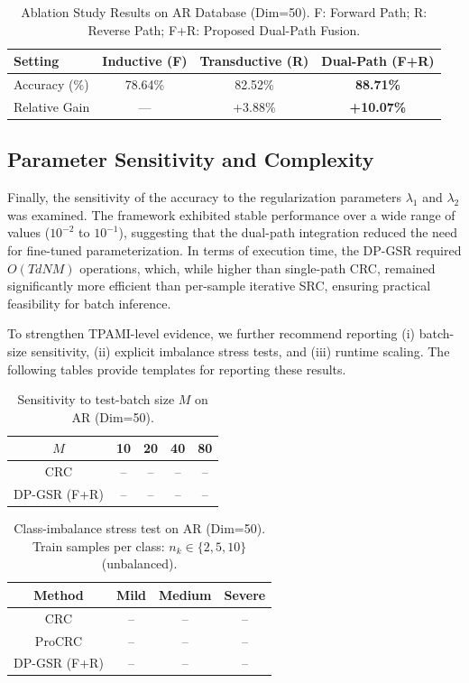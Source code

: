 \documentclass[10pt,comsoc]{IEEEtran}
\begin{document}
\begin{table}[h]
\centering
\caption{Ablation Study Results on AR Database (Dim=50). F: Forward Path; R: Reverse Path; F+R: Proposed Dual-Path Fusion.}
\label{tab:ablation}
\begin{tabular}{lccc}
\hline
\textbf{Setting} & \textbf{Inductive (F)} & \textbf{Transductive (R)} & \textbf{Dual-Path (F+R)} \\ \hline
Accuracy (\%)    & 78.64\%                & 82.52\%                   & \textbf{88.71\%}          \\
Relative Gain    & ---                    & +3.88\%                   & \textbf{+10.07\%}         \\ \hline
\end{tabular}
\end{table}

\subsection{Parameter Sensitivity and Complexity}
Finally, the sensitivity of the accuracy to the regularization parameters $\lambda_1$ and $\lambda_2$ was examined. The framework exhibited stable performance over a wide range of values ($10^{-2}$ to $10^{-1}$), suggesting that the dual-path integration reduced the need for fine-tuned parameterization. In terms of execution time, the DP-GSR required $O(T dNM)$ operations, which, while higher than single-path CRC, remained significantly more efficient than per-sample iterative SRC, ensuring practical feasibility for batch inference.

To strengthen TPAMI-level evidence, we further recommend reporting (i) batch-size sensitivity, (ii) explicit imbalance stress tests, and (iii) runtime scaling. The following tables provide templates for reporting these results.

\begin{table}[t]
\centering
\caption{Sensitivity to test-batch size $M$ on AR (Dim=50).}
\label{tab:batchsize}
\begin{tabular}{c|cccc}
\hline
$M$ & 10 & 20 & 40 & 80 \\ \hline
CRC & -- & -- & -- & -- \\
DP-GSR (F+R) & -- & -- & -- & -- \\
\hline
\end{tabular}
\end{table}

\begin{table}[t]
\centering
\caption{Class-imbalance stress test on AR (Dim=50). Train samples per class: $n_k\in\{2,5,10\}$ (unbalanced).}
\label{tab:imbalance}
\begin{tabular}{c|ccc}
\hline
Method & Mild & Medium & Severe \\ \hline
CRC & -- & -- & -- \\
ProCRC & -- & -- & -- \\
DP-GSR (F+R) & -- & -- & -- \\
\hline
\end{tabular}
\end{table}
\end{document}
